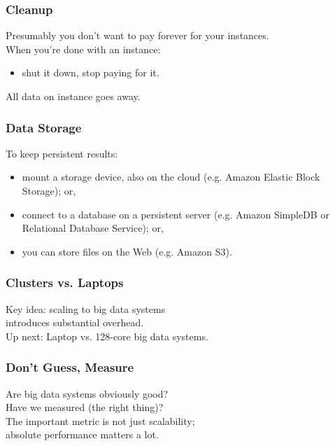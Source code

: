 \begin{frame}
  \frametitle{Cleanup}

  
Presumably you don't want to pay forever for your instances.\\[1em]

When you're done with an instance:
\begin{itemize}
\item shut it down, stop paying for it.
\end{itemize}

All data on instance goes away.
  
\end{frame}


\begin{frame}
  \frametitle{Data Storage}
  
To keep persistent results:
\begin{itemize}
\item mount a storage device,
also on the cloud (e.g. Amazon Elastic Block Storage); or, 
\item connect to a database on a persistent server (e.g. Amazon SimpleDB or
Relational Database Service); or, 
\item you can store files on the Web (e.g. Amazon S3). 
\end{itemize}
  
\end{frame}


\begin{frame}
\frametitle{Clusters vs. Laptops}

\Large
\begin{changemargin}{1cm}
Key idea: scaling to big data systems \\
introduces substantial overhead. \\[1em]
Up next: Laptop vs. 128-core big data systems.
\end{changemargin}

\end{frame}



\begin{frame}
\frametitle{Don't Guess, Measure}

\Large
\begin{changemargin}{1cm}
Are big data systems obviously good?\\
Have we measured (the right thing)?\\[1em]

The important metric is not just scalability; \\
absolute performance matters a lot. 

\end{changemargin}

\end{frame}



